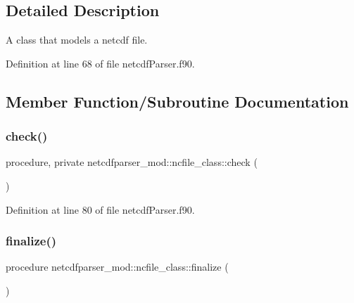 \subsection{Detailed Description}
A class that models a netcdf file. 

Definition at line 68 of file netcdf\+Parser.\+f90.



\subsection{Member Function/\+Subroutine Documentation}
\mbox{\label{structnetcdfparser__mod_1_1ncfile__class_a2b41dc377688a881f9252bd4fc09bec9}} 
\subsubsection{\texorpdfstring{check()}{check()}}
{\footnotesize\ttfamily procedure, private netcdfparser\+\_\+mod\+::ncfile\+\_\+class\+::check (\begin{DoxyParamCaption}{ }\end{DoxyParamCaption})\hspace{0.3cm}{\ttfamily [private]}}



Definition at line 80 of file netcdf\+Parser.\+f90.

\mbox{\label{structnetcdfparser__mod_1_1ncfile__class_a62c3404b0742346374753743e349e6f1}} 
\subsubsection{\texorpdfstring{finalize()}{finalize()}}
{\footnotesize\ttfamily procedure netcdfparser\+\_\+mod\+::ncfile\+\_\+class\+::finalize (\begin{DoxyParamCaption}{ }\end{DoxyParamCaption})\hspace{0.3cm}{\ttfamily [private]}}



